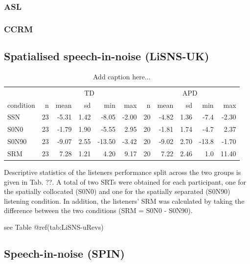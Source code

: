 \documentclass[a4paper,nobind]{templates/ociamthesis}
\begin{document}
\hypertarget{asl}{%
\subsubsection{ASL}\label{asl}}

\hypertarget{ccrm}{%
\subsubsection{CCRM}\label{ccrm}}

\hypertarget{spatialised-speech-in-noise-lisns-uk-1}{%
\subsection{Spatialised speech-in-noise
(LiSNS-UK)}\label{spatialised-speech-in-noise-lisns-uk-1}}

\begin{table}

\caption{\label{tab:LiSNS-uRevs}Add caption here...}
\centering
\begin{tabular}[t]{lrrrrrrrrrr}
\toprule
\multicolumn{1}{c}{ } & \multicolumn{5}{c}{TD} & \multicolumn{5}{c}{APD} \\
\cmidrule(l{3pt}r{3pt}){2-6} \cmidrule(l{3pt}r{3pt}){7-11}
condition & n & mean & sd & min & max & n & mean & sd & min & max\\
\midrule
SSN & 23 & -5.31 & 1.42 & -8.05 & -2.00 & 20 & -4.82 & 1.36 & -7.4 & -2.30\\
S0N0 & 23 & -1.79 & 1.90 & -5.55 & 2.95 & 20 & -1.81 & 1.74 & -4.7 & 2.37\\
S0N90 & 23 & -9.07 & 2.55 & -13.50 & -3.42 & 20 & -9.02 & 2.70 & -13.8 & -1.70\\
SRM & 23 & 7.28 & 1.21 & 4.20 & 9.17 & 20 & 7.22 & 2.46 & 1.0 & 11.40\\
\bottomrule
\end{tabular}
\end{table}

Descriptive statistics of the listeners performance split across the two
groups is given in Tab. ??. A total of two SRTs were obtained for each
participant, one for the spatially collocated (S0N0) and one for the
spatially separated (S0N90) listening condition. In addition, the
listeners' SRM was calculated by taking the difference between the two
conditions (SRM = S0N0 - S0N90).

see Table @ref(tab:LiSNS-uRevs)

\hypertarget{speech-in-noise-spin-1}{%
\subsection{Speech-in-noise (SPIN)}\label{speech-in-noise-spin-1}}
\end{document}
